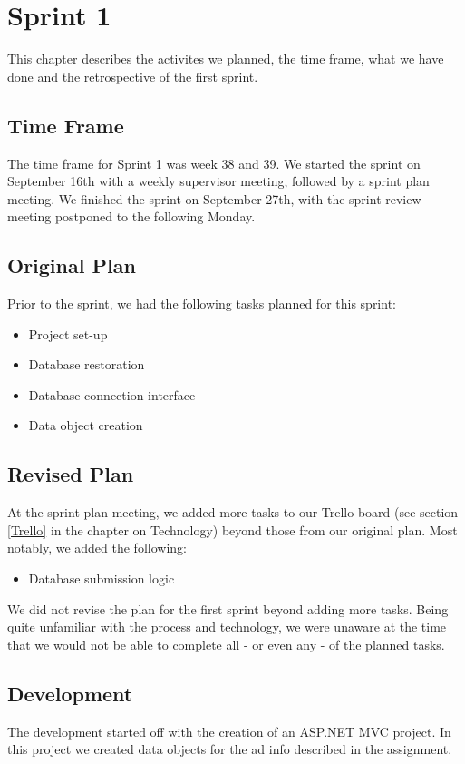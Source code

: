 \chapter{Sprint 1}
This chapter describes the activites we planned, the time frame, what we have done and the retrospective of the first sprint. 
\newpage 

\section{Time Frame}
The time frame for Sprint 1 was week 38 and 39. We started the sprint on September 16th with a weekly supervisor meeting, followed by a sprint plan meeting. We finished the sprint on September 27th, with the sprint review meeting postponed to the following Monday.

\section{Original Plan}
Prior to the sprint, we had the following tasks planned for this sprint:
\begin{itemize}
	\item Project set-up
	\item Database restoration
	\item Database connection interface
	\item Data object creation
\end{itemize}

\section{Revised Plan}
At the sprint plan meeting, we added more tasks to our Trello board (see section \ref{Trello} in the chapter on Technology) beyond those from our original plan. Most notably, we added the following:
\begin{itemize}
	\item Database submission logic
\end{itemize}

We did not revise the plan for the first sprint beyond adding more tasks. Being quite unfamiliar with the process and technology, we were unaware at the time that we would not be able to complete all - or even any - of the planned tasks.

\section{Development}
The development started off with the creation of an ASP.NET MVC project. In this project we created data objects for the ad info described in the assignment.

